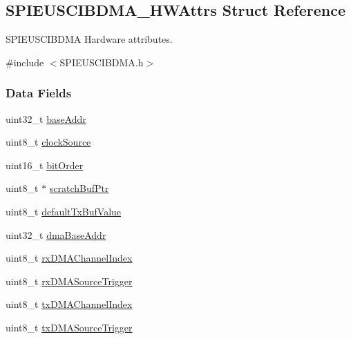 \subsection{S\+P\+I\+E\+U\+S\+C\+I\+B\+D\+M\+A\+\_\+\+H\+W\+Attrs Struct Reference}
\label{struct_s_p_i_e_u_s_c_i_b_d_m_a___h_w_attrs}


S\+P\+I\+E\+U\+S\+C\+I\+B\+D\+M\+A Hardware attributes.  




{\ttfamily \#include $<$S\+P\+I\+E\+U\+S\+C\+I\+B\+D\+M\+A.\+h$>$}

\subsubsection*{Data Fields}
\begin{DoxyCompactItemize}
\item 
uint32\+\_\+t \hyperlink{struct_s_p_i_e_u_s_c_i_b_d_m_a___h_w_attrs_abcb08979f4f6514395d165403a23d100}{base\+Addr}
\item 
uint8\+\_\+t \hyperlink{struct_s_p_i_e_u_s_c_i_b_d_m_a___h_w_attrs_aadc46ff9966c16d3e8782588ee594f2c}{clock\+Source}
\item 
uint16\+\_\+t \hyperlink{struct_s_p_i_e_u_s_c_i_b_d_m_a___h_w_attrs_aedc1eb38d11274b1b32ccf88b11478f1}{bit\+Order}
\item 
uint8\+\_\+t $\ast$ \hyperlink{struct_s_p_i_e_u_s_c_i_b_d_m_a___h_w_attrs_a1bc0bb9638fffd6efdac516166eef7f5}{scratch\+Buf\+Ptr}
\item 
uint8\+\_\+t \hyperlink{struct_s_p_i_e_u_s_c_i_b_d_m_a___h_w_attrs_a6f0001b2be72f6afc2e5defc8a51d08c}{default\+Tx\+Buf\+Value}
\item 
uint32\+\_\+t \hyperlink{struct_s_p_i_e_u_s_c_i_b_d_m_a___h_w_attrs_aed70de0b11f45efaa4715cff4cf23834}{dma\+Base\+Addr}
\item 
uint8\+\_\+t \hyperlink{struct_s_p_i_e_u_s_c_i_b_d_m_a___h_w_attrs_a8ac5bb8492f71cb784577721ccfba7ad}{rx\+D\+M\+A\+Channel\+Index}
\item 
uint8\+\_\+t \hyperlink{struct_s_p_i_e_u_s_c_i_b_d_m_a___h_w_attrs_a7ba8e3280a483f1affacac0d603f8611}{rx\+D\+M\+A\+Source\+Trigger}
\item 
uint8\+\_\+t \hyperlink{struct_s_p_i_e_u_s_c_i_b_d_m_a___h_w_attrs_aebb1c494a4118fd5393db92c72f47770}{tx\+D\+M\+A\+Channel\+Index}
\item 
uint8\+\_\+t \hyperlink{struct_s_p_i_e_u_s_c_i_b_d_m_a___h_w_attrs_a683a8356a28b557d278d969bab6f1ef8}{tx\+D\+M\+A\+Source\+Trigger}
\end{DoxyCompactItemize}


